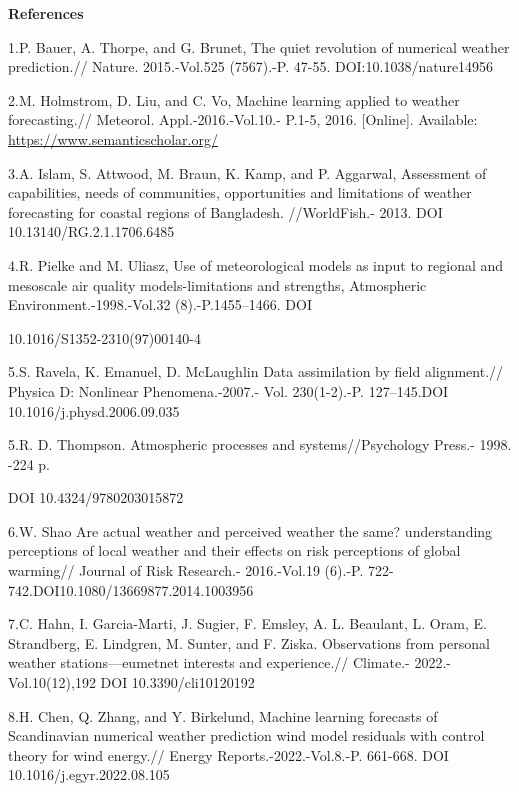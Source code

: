 \begin{center}
{\bfseries References}
\end{center}

\begin{noparindent}
1.P. Bauer, A. Thorpe, and G. Brunet, The quiet revolution of numerical
weather prediction.// Nature. 2015.-Vol.525 (7567).-P. 47-55.
DOI:10.1038/nature14956


2.M. Holmstrom, D. Liu, and C. Vo, Machine learning applied to weather
forecasting.// Meteorol. Appl.-2016.-Vol.10.- P.1-5, 2016. {[}Online{]}.
Available: \href{https://www.semanticscholar.org/paper/Machine-Learning-Applied-to-Weather-Forecasting-
Holmstrom-Liu/e2ed8aba53b4688808d57a0512496beb3548fc2c}{https://www.semanticscholar.org/}

3.A. Islam, S. Attwood, M. Braun, K. Kamp, and P. Aggarwal, Assessment
of capabilities, needs of communities, opportunities and limitations of
weather forecasting for coastal regions of Bangladesh. //WorldFish.-
2013. DOI 10.13140/RG.2.1.1706.6485

4.R. Pielke and M. Uliasz, Use of meteorological models as input to
regional and mesoscale air quality models-limitations and strengths,
Atmospheric Environment.-1998.-Vol.32 (8).-P.1455--1466. DOI

10.1016/S1352-2310(97)00140-4

5.S. Ravela, K. Emanuel, D. McLaughlin Data assimilation by field
alignment.// Physica D: Nonlinear Phenomena.-2007.- Vol. 230(1-2).-P.
127--145.DOI 10.1016/j.physd.2006.09.035

5.R. D. Thompson. Atmospheric processes and systems//Psychology Press.-
1998. -224 p.

DOI 10.4324/9780203015872

6.W. Shao Are actual weather and perceived weather the same?
understanding perceptions of local weather and their effects on risk
perceptions of global warming// Journal of Risk Research.- 2016.-Vol.19
(6).-P. 722-742.DOI10.1080/13669877.2014.1003956

7.C. Hahn, I. Garcia-Marti, J. Sugier, F. Emsley, A. L. Beaulant, L.
Oram, E. Strandberg, E. Lindgren, M. Sunter, and F. Ziska. Observations
from personal weather stations---eumetnet interests and experience.//
Climate.- 2022.-Vol.10(12),192 DOI 10.3390/cli10120192

8.H. Chen, Q. Zhang, and Y. Birkelund, Machine learning forecasts of
Scandinavian numerical weather prediction wind model residuals with
control theory for wind energy.// Energy Reports.-2022.-Vol.8.-P.
661-668. DOI 10.1016/j.egyr.2022.08.105


\end{noparindent}
